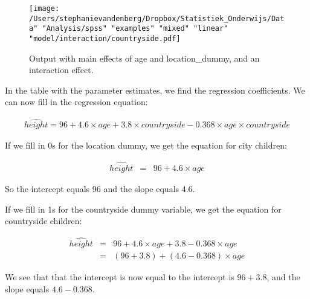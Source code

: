 \begin{figure}[h]
    \begin{center}
       \texttt{[image: /Users/stephanievandenberg/Dropbox/Statistiek\_Onderwijs/Data" "Analysis/spss" "examples" "mixed" "linear" "model/interaction/countryside.pdf]}
    \end{center}
    \label{fig:interactionheight}
    \caption{Output with main effects of age and location\_dummy, and an interaction effect.}
\end{figure}




In the table with the parameter estimates, we find the regression coefficients. We can now fill in the regression equation:

\begin{eqnarray} 
\widehat{height} = 96 + 4.6 \times age + 3.8  \times countryside - 0.368 \times  age \times countryside \nonumber
\end{eqnarray}


If we fill in 0s for the location dummy, we get the equation for city children:

\begin{eqnarray} 
\widehat{height} &=& 96 + 4.6  \times age    \nonumber
 \end{eqnarray}

So the intercept equals 96 and the slope equals 4.6.

If we fill in 1s for the countryside dummy variable, we get the equation for countryside children:

\begin{eqnarray} 
\widehat{height} &=& 96 + 4.6  \times age + 3.8   - 0.368  \times age  \\ \nonumber
      &=& (96+ 3.8) + (4.6 - 0.368) \times age    \nonumber
 \end{eqnarray}

We see that that the intercept is now equal to the intercept is $96+ 3.8$, and the slope equals $4.6-0.368$. 

